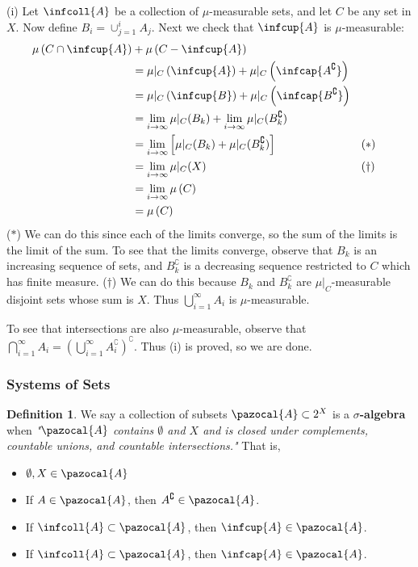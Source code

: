 \documentclass[a5paper]{article}
\makeatletter
\theoremstyle{definition}%
\newtheorem*{definition*}{Definition}
\numberwithin{exercise}{section}
\theoremstyle{remark}%
\renewcommand{\measure}[1]{\mu\left(#1\right)}
\newcommand{\mumeasurable}{$\mu$-measurable}
\renewcommand{\script}[1]{\pazocal{#1}}
\renewenvironment{proof}{{Proof.}}{\qed}
\renewenvironment{proof}[1][\proofname.]{\par
  \pushQED{\qed}%
  \normalfont \topsep6\p@\@plus6\p@\relax
  \trivlist
  \item[\hskip\labelsep
        \scshape
    #1\@addpunct{}]\ignorespaces
}{%
  \popQED\endtrivlist\@endpefalse
}
\makeatother
\begin{document}
\begin{proof}
(i) Let $\infcoll{A}$ be a collection of \mumeasurable{} sets, and let $C$ be any set in $X$. Now define $B_i=\cup_{j=1}^i A_j$. Next we check that $\infcup{A}$ is \mumeasurable{}:
\begin{align*}
\measure{C\cap\infcup{A}}&+\measure{C-\infcup{A}}\\
&=\mu|_C\left(\infcup{A}\right)+\mu|_C\left(\infcap{A^\complement}\right) \\
&=\mu|_C\left(\infcup{B}\right)+\mu|_C\left(\infcap{B^\complement}\right) \\
&=\lim_{i\to\infty}\mu|_C(B_k) + \lim_{i\to\infty}\mu|_C(B_k^\complement) \\
&=\lim_{i\to\infty}\left[\mu|_C(B_k) + \mu|_C(B_k^\complement)\right] &&(*)\\
&=\lim_{i\to\infty}\mu|_C(X) && (\dagger)\\
&=\lim_{i\to\infty}\measure{C} \\
&=\measure{C}
\end{align*}
($*$) We can do this since each of the limits converge, so the sum of the limits is the limit of the sum. To see that the limits converge, observe that $B_k$ is an increasing sequence of sets, and $B_k^\complement$ is a decreasing sequence restricted to $C$ which has finite measure. ($\dagger$) We can do this because $B_k$ and $B_k^\complement$ are $\mu|_C$-measurable disjoint sets whose sum is $X$. Thus $\bigcup_{i=1}^\infty A_i$ is \mumeasurable{}. 

To see that intersections are also \mumeasurable{}, observe that $\bigcap_{i=1}^\infty A_i=\left(\bigcup_{i=1}^\infty A_i^\complement\right)^\complement.$ Thus (i) is proved, so we are done.
\end{proof}

\pagebreak
\subsubsection{Systems of Sets}

\begin{highlight}
\begin{definition*}
We say a collection of subsets $\script{A}\subset2^X$ is a \textbf{$\sigma$-algebra} when \linebreak \textit{"$\script{A}$ contains $\emptyset$ and $X$ and is closed under complements, countable unions, and countable intersections."} That is, 
\begin{itemize}
\item $\emptyset, X \in \script{A}$
\item If $A\in\script{A}$, then $A^\complement\in\script{A}$. 
\item If $\infcoll{A}\subset\script{A}$, then $\infcup{A}\in\script{A}$. 
\item If $\infcoll{A}\subset\script{A}$, then $\infcap{A}\in\script{A}$. 
\end{itemize}
\end{definition*}
\end{highlight}
\end{document}
